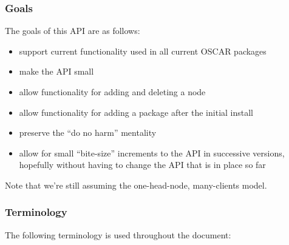 
\subsubsection{Goals}

The goals of this API are as follows:

\begin{itemize}
\item support current functionality used in all current OSCAR packages
\item make the API small
\item allow functionality for adding and deleting a node
\item allow functionality for adding a package after the initial
  install
\item preserve the ``do no harm'' mentality
\item allow for small ``bite-size'' increments to the API in
  successive versions, hopefully without having to change the API that
  is in place so far
\end{itemize}

Note that we're still assuming the one-head-node, many-clients model.


\subsubsection{Terminology}

The following terminology is used throughout the document:

